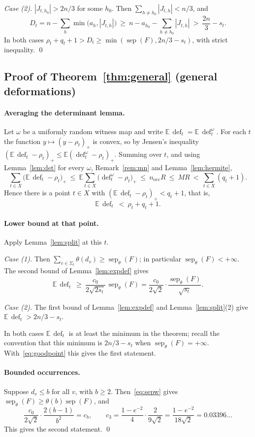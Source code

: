 \documentclass[11pt,a4paper]{article}
\theoremstyle{definition}
\theoremstyle{remark}
\newcommand{\E}{\mathbb{E}}
\newcommand{\sep}{\operatorname{sep}}
\newcommand{\sepw}{\operatorname{sep}_{\theta}}
\newcommand{\dfc}{\operatorname{def}}
\newcommand{\nocc}{n_{\mathrm{occ}}}
\begin{document}
\emph{Case (2).} $|J_{t,h_0}|>2n/3$ for some $h_0$. Then $\sum_{h\ne h_0}|J_{t,h}|<n/3$, and
\[
D_t=n-\sum_h\min\bigl(a_h,|J_{t,h}|\bigr)\ \ge\ n-a_{h_0}-\sum_{h\ne h_0}|J_{t,h}|
\ >\ \frac{2n}{3}-s_t .
\]
In both cases $\rho_t+q_t+1>D_t\ge\min(\sep(F),2n/3-s_t)$, with strict inequality. \qed

\subsection{Proof of Theorem~\ref{thm:general} (general deformations)}

\paragraph{Averaging the determinant lemma.} Let $\omega$ be a uniformly random witness map
and write $\E\,\dfc_t=\E\,\dfc^\omega_t$. For each $t$ the function $y\mapsto(y-\rho_t)_+$ is
convex, so by Jensen's inequality $(\E\,\dfc_t-\rho_t)_+\le\E(\dfc^\omega_t-\rho_t)_+$.
Summing over $t$, and using Lemma~\ref{lem:det} for every $\omega$, Remark~\ref{rem:mn} and
Lemma~\ref{lem:hermite},
\[
\sum_{t\in X}\bigl(\E\,\dfc_t-\rho_t\bigr)_+\ \le\ \E\sum_{t\in X}\bigl(\dfc^\omega_t-\rho_t\bigr)_+
\ \le\ \nocc R\ \le\ MR\ <\ \sum_{t\in X}(q_t+1).
\]
Hence there is a point $t\in X$ with $(\E\,\dfc_t-\rho_t)_+<q_t+1$, that is,
\begin{equation}\label{eq:goodpoint}
\E\,\dfc_t\ <\ \rho_t+q_t+1 .
\end{equation}

\paragraph{Lower bound at that point.} Apply Lemma~\ref{lem:split} at this $t$.

\emph{Case (1).} Then $\sum_{v\in\Sigma_t}\theta(d_v)\ge\sepw(F)$; in particular
$\sepw(F)<+\infty$. The second bound of Lemma~\ref{lem:expdef} gives
\[
\E\,\dfc_t\ \ge\ \frac{c_0}{2\sqrt{2s_t}}\,\sepw(F)=\frac{c_0}{2\sqrt2}\cdot\frac{\sepw(F)}{\sqrt{s_t}} .
\]

\emph{Case (2).} The first bound of Lemma~\ref{lem:expdef} and Lemma~\ref{lem:split}(2) give
$\E\,\dfc_t>2n/3-s_t$.

In both cases $\E\,\dfc_t$ is at least the minimum in the theorem; recall the convention
that this minimum is $2n/3-s_t$ when $\sepw(F)=+\infty$. With~\eqref{eq:goodpoint} this
gives the first statement.

\paragraph{Bounded occurrences.} Suppose $d_v\le b$ for all $v$, with $b\ge2$.
Then~\eqref{eq:sepw} gives $\sepw(F)\ge\theta(b)\sep(F)$, and
\[
\frac{c_0}{2\sqrt2}\cdot\frac{2(b-1)}{b^2}=c_b,\qquad
c_3=\frac{1-e^{-2}}{4}\cdot\frac{2}{9\sqrt2}=\frac{1-e^{-2}}{18\sqrt2}=0.03396\ldots
\]
This gives the second statement. \qed
\end{document}
